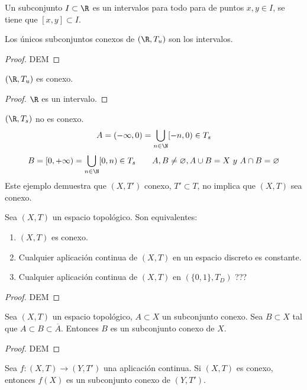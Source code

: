 \begin{ndef}[Intervalo]
    Un subconjunto $I \subset \R$ es un intervalos para todo para de puntos $x,y \in I$, se tiene que $[x,y] \subset I$.
\end{ndef}
\begin{nth}
  Los únicos subconjuntos conexos de $(\R,T_u)$ son los intervalos.
\end{nth}
\begin{proof}
    DEM
\end{proof}
\begin{ncor}
  $(\R, T_u)$ es conexo.
\end{ncor}
\begin{proof}
    $\R$ es un intervalo.
\end{proof}
\begin{exmp}
    $(\R,T_s)$ no es conexo. $$A = (-\infty, 0) = \bigcup_{n \in \N} [-n,0) \in T_s$$
    $$
    B = [0,+\infty) = \bigcup_{n \in \N} [0,n) \in T_s \qquad A,B \neq \varnothing, A \cup B = X\ y\ A \cap B = \varnothing
    $$
    Este ejemplo demuestra que $(X,T')$ conexo, $T' \subset T$, no implica que $(X,T)$ sea conexo.
\end{exmp}

\begin{lema}
  Sea $(X,T)$ un espacio topológico. Son equivalentes:
  \begin{enumerate}
      \item $(X,T)$ es conexo.
      \item Cualquier aplicación continua de $(X,T)$ en un espacio discreto es constante.
      \item Cualquier aplicación continua de $(X,T)$ en $(\{0,1\}, T_D)$ ???
  \end{enumerate}
\end{lema}
\begin{proof}
    DEM
\end{proof}

\begin{ncor}
  Sea $(X,T)$ un espacio topológico, $A \subset X$ un subconjunto conexo. Sea $B \subset X$ tal que $A \subset B \subset \overline{A}$. Entonces $B$ es un subconjunto conexo de $X$.
\end{ncor}
\begin{proof}
    DEM
\end{proof}

\begin{nth}
  Sea $f: (X,T) \to (Y,T')$ una aplicación continua. Si $(X,T)$ es conexo, entonces $f(X)$ es un subconjunto conexo de $(Y,T')$.
\end{nth}

